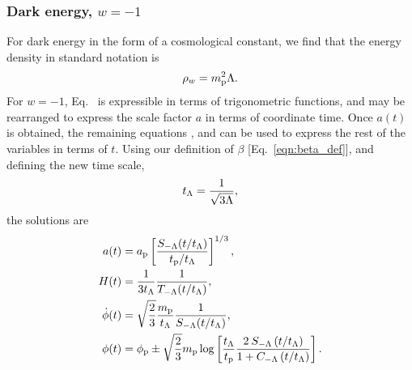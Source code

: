 \subsubsection{Dark energy, $w=-1$}
For dark energy in the form of a cosmological constant, we find that
the energy density in standard notation is
%
\begin{equation}
  \rho_w = m_{\mathrm{p}}^2\Lambda.
\end{equation}
%
For $w=-1$, Eq.\  is expressible in terms of
trigonometric functions, and may be rearranged to express the scale
factor $a$ in terms of coordinate time. Once $a(t)$ is obtained, the
remaining equations ,  and
 can be used to express the rest of the variables
in terms of $t$. Using our definition of $\beta$ [Eq.\ \nolinebreak\ref{eqn:beta_def}], and defining the new time scale,
%
\begin{equation}
  t_\mathrm{\Lambda} = \frac{1}{\sqrt{3\Lambda}},
  \label{eqn:tl}
\end{equation}
%
the solutions are
%
\begin{align}
  a(t)
  &=
  a_{\mathrm{p}}\left[{\frac {S_{-\Lambda}(t/t_\mathrm{\Lambda})}{t_{\mathrm{p}}/t_\mathrm{\Lambda}}}\right]^{1/3},
  \\
  H(t)
  &=
  \frac{1}{3t_\mathrm{\Lambda}}\frac{1}{T_{-\Lambda}(t/t_\mathrm{\Lambda})},
  \\
  \dot{\phi}(t)
  &=
  \sqrt{\frac{2}{3}}\frac{m_{\mathrm{p}}}{t_\mathrm{\Lambda}}\frac{1}{S_{-\Lambda}(t/t_\mathrm{\Lambda})},
  \\
  \phi(t)
  &=
  \phi_{\mathrm{p}} \pm \sqrt{\frac{2}{3}}m_{\mathrm{p}}
  \log\left[
  \frac{t_\mathrm{\Lambda}}{t_{\mathrm{p}}} 
  \frac 
  {2\: S_{-\Lambda} \left( t/t_\mathrm{\Lambda} \right) }
  {1 + C_{-\Lambda} \left( t/t_\mathrm{\Lambda} \right)}  
  \right].
\end{align}
%

